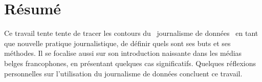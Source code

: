 \documentclass[12pt,a4paper,french,twoside,openright,oldfontcommands,final]{memoir}
\makeatletter
\providecommand{\og}{\leavevmode\flqq~}
\providecommand{\fg}{\ifdim\lastskip>\z@\unskip\fi~\frqq}
\theoremstyle{plain}
\theoremstyle{definition}
\makeatother
\begin{document}
\section*{Résumé}

Ce travail tente tente de tracer les contours du \og journalisme de données \fg en tant que nouvelle pratique journalistique, de définir quels sont ses buts et ses méthodes. Il se focalise aussi sur son introduction naissante dans les médias belges francophones, en présentant quelques cas significatifs. Quelques réflexions personnelles sur l'utilisation du journalisme de données concluent ce travail.

\vfill


\thispagestyle{empty}
\end{document}
